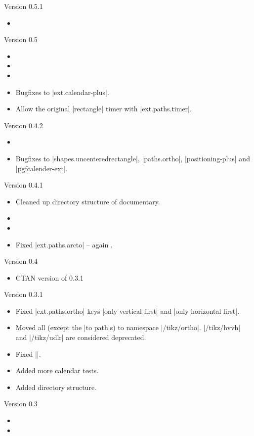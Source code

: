 \begin{multicols}{2}\raggedright
\noindent
Version 0.5.1
\begin{itemize}
\item {}
\end{itemize}
Version 0.5
\begin{itemize}
\item {}
\item {}
\item {}
\item Bugfixes to |ext.calendar-plus|.
\item Allow the original |rectangle| timer with |ext.paths.timer|.
\end{itemize}
Version 0.4.2
\begin{itemize}
\item {}
\item Bugfixes to |shapes.uncenteredrectangle|, |paths.ortho|, |positioning-plus| and |pgfcalender-ext|.
\end{itemize}
Version 0.4.1
\begin{itemize}
\item Cleaned up directory structure of documentary.
\item {}
\item {}
\item Fixed |ext.paths.arcto| -- again \cite{GH2}.
\end{itemize}
Version 0.4
\begin{itemize}
\item CTAN version of 0.3.1
\end{itemize}
Version 0.3.1
\begin{itemize}
\item Fixed |ext.paths.ortho| keys |only vertical first| and |only horizontal first|.
\item Moved all (except the |to path|s) to namespace |/tikz/ortho|.
     |/tikz/hvvh| and |/tikz/udlr| are considered deprecated.
\item Fixed |\pgfcalendarjulianyeartoweek|.
\item Added more calendar tests.
\item Added directory structure.
\end{itemize}
Version 0.3
\begin{itemize}
\item {}
\item {}

\end{itemize}
\end{multicols}
